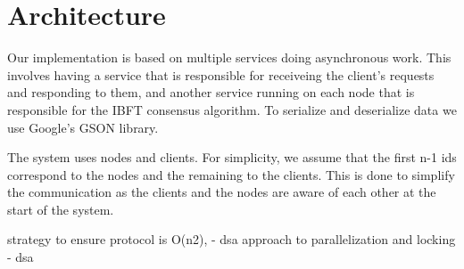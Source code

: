 \documentclass{article}
\begin{document}
\section{Architecture}
Our implementation is based on multiple services doing asynchronous work. This 
involves having a service that is responsible for receiveing the client's requests and responding to 
them, and another service running on each node that is responsible for the IBFT consensus algorithm.
To serialize and deserialize data we use Google's GSON library.

The system uses nodes and clients. For simplicity, we assume that the first n-1 ids correspond to the 
nodes and the remaining to the clients. This is done to simplify the communication as the clients and the 
nodes are aware of each other at the start of the system.

strategy to ensure protocol is O(n2), - dsa 
approach to parallelization and locking - dsa


\newpage



% 

\end{document}
